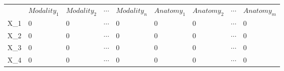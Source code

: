 \begin{table}[]
    \begin{tabular}{lllll|llll}
         & $Modality_1$ & $Modality_2$ & $\cdots$ & $Modality_n$ & $Anatomy_1$ & $Anatomy_2$ & $\cdots$ & $Anatomy_m$ \\
    X\_1 & 0  & 0  & $\cdots$     & 0   & 0     & 0       & $\cdots$ & 0    \\
    X\_2 & 0  & 0  & $\cdots$     & 0   & 0     & 0       & $\cdots$ & 0    \\
    X\_3 & 0  & 0  & $\cdots$     & 0   & 0     & 0       & $\cdots$ & 0    \\
    X\_4 & 0  & 0  & $\cdots$     & 0   & 0     & 0       & $\cdots$ & 0    \\
    \end{tabular}
    \end{table}
